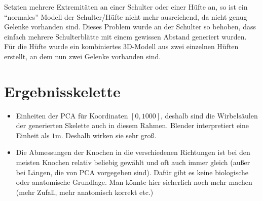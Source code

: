 
Setzten mehrere Extremitäten an einer Schulter oder einer Hüfte an, so ist ein "`normales"' Modell der Schulter/Hüfte nicht mehr ausreichend, da nicht genug Gelenke vorhanden sind. Dieses Problem wurde an der Schulter so behoben, dass einfach mehrere Schulterblätte mit einem gewissen Abstand generiert wurden. Für die Hüfte wurde ein kombiniertes 3D-Modell aus zwei einzelnen Hüften erstellt, an dem nun zwei Gelenke vorhanden sind.



\section{Ergebnisskelette}

\begin{itemize}
 \item Einheiten der PCA für Koordinaten $[0, 1000]$, deshalb sind die Wirbelsäulen der generierten Skelette auch in diesem Rahmen. Blender interpretiert eine Einheit als $1$m. Deshalb wirken sie sehr groß.
 
 \item Die Abmessungen der Knochen in die verschiedenen Richtungen ist bei den meisten Knochen relativ beliebig gewählt und oft auch immer gleich (außer bei Längen, die von PCA vorgegeben sind). Dafür gibt es keine biologische oder anatomische Grundlage. Man könnte hier sicherlich noch mehr machen (mehr Zufall, mehr anatomisch korrekt etc.)
\end{itemize}

